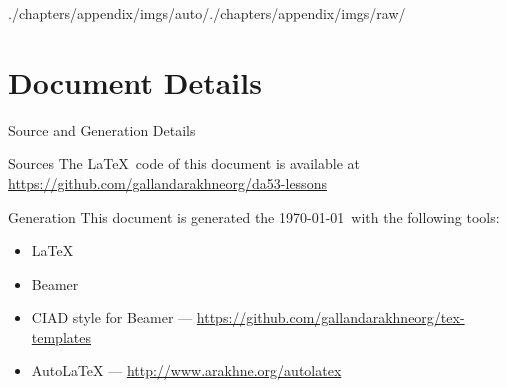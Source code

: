 \begin{graphicspathcontext}{{./chapters/appendix/imgs/auto/}{./chapters/appendix/imgs/raw/}}
\section{Document Details}
\begin{frame}{Source and Generation Details}
	\begin{block}{Sources}
		The \LaTeX\ code of this document is available at \url{https://github.com/gallandarakhneorg/da53-lessons}
	\end{block}
	\begin{block}{Generation}
		This document is generated the \today\ with the following tools:
		\begin{itemize}
		\item \LaTeX
		\item Beamer
		\item CIAD style for Beamer --- \url{https://github.com/gallandarakhneorg/tex-templates}
		\item AutoLaTeX --- \url{http://www.arakhne.org/autolatex}
		\end{itemize}
	\end{block}
\end{frame}


\end{graphicspathcontext}
